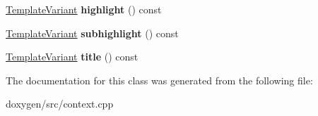 \begin{DoxyCompactItemize}
\mbox{\hyperlink{class_template_variant}{Template\+Variant}} {\bfseries highlight} () const
\item 
\mbox{\label{class_class_members_index_context_1_1_private_ab6e3c1b06c005fd07d764d975332f7aa}} 
\mbox{\hyperlink{class_template_variant}{Template\+Variant}} {\bfseries subhighlight} () const
\item 
\mbox{\label{class_class_members_index_context_1_1_private_a425fb354fb0faeff671116921ca0fbe2}} 
\mbox{\hyperlink{class_template_variant}{Template\+Variant}} {\bfseries title} () const
\end{DoxyCompactItemize}


The documentation for this class was generated from the following file\+:\begin{DoxyCompactItemize}
\item 
doxygen/src/context.\+cpp\end{DoxyCompactItemize}
